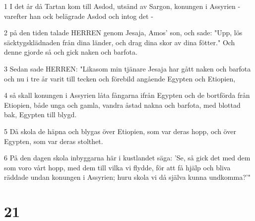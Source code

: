 \par 1 I det år då Tartan kom till Asdod, utsänd av Sargon, konungen i Assyrien - varefter han ock belägrade Asdod och intog det -
\par 2 på den tiden talade HERREN genom Jesaja, Amos' son, och sade: "Upp, lös säcktygsklädnaden från dina länder, och drag dina skor av dina fötter." Och denne gjorde så och gick naken och barfota.
\par 3 Sedan sade HERREN: "Likasom min tjänare Jesaja har gått naken och barfota och nu i tre år varit till tecken och förebild angående Egypten och Etiopien,
\par 4 så skall konungen i Assyrien låta fångarna ifrån Egypten och de bortförda från Etiopien, både unga och gamla, vandra åstad nakna och barfota, med blottad bak, Egypten till blygd.
\par 5 Då skola de häpna och blygas över Etiopien, som var deras hopp, och över Egypten, som var deras stolthet.
\par 6 På den dagen skola inbyggarna här i kustlandet säga: 'Se, så gick det med dem som voro vårt hopp, med dem till vilka vi flydde, för att få hjälp och bliva räddade undan konungen i Assyrien; huru skola vi då själva kunna undkomma?'"

\chapter{21}

